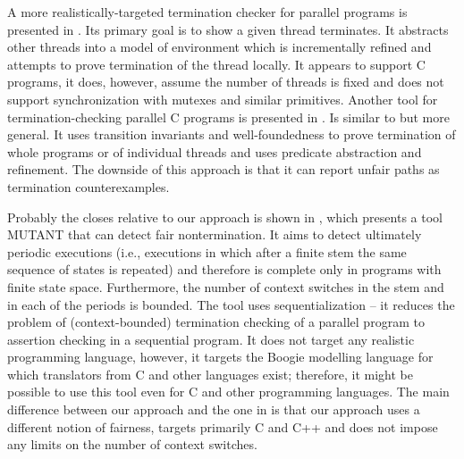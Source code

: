 
A more realistically-targeted termination checker for parallel programs is presented in .
Its primary goal is to show a given thread terminates.
It abstracts other threads into a model of environment which is incrementally refined and attempts to prove termination of the thread locally.
It appears to support C programs, it does, however, assume the number of threads is fixed and does not support synchronization with mutexes and similar primitives.
Another tool for termination-checking parallel C programs is presented in .
Is similar to \cite{Cook2007thr} but more general.
It uses transition invariants and well-foundedness to prove termination of whole programs or of individual threads and uses predicate abstraction and refinement.
The downside of this approach is that it can report unfair paths as termination counterexamples.

Probably the closes relative to our approach is shown in , which presents a tool MUTANT that can detect fair nontermination.
It aims to detect ultimately periodic executions (i.e., executions in which after a finite stem the same sequence of states is repeated) and therefore is complete only in programs with finite state space.
Furthermore, the number of context switches in the stem and in each of the periods is bounded.
The tool uses sequentialization -- it reduces the problem of (context-bounded) termination checking of a parallel program to assertion checking in a sequential program.
It does not target any realistic programming language, however, it targets the Boogie modelling language for which translators from C and other languages exist; therefore, it might be possible to use this tool even for C and other programming languages.
The main difference between our approach and the one in \cite{Atig2012term} is that our approach uses a different notion of fairness, targets primarily C and C++ and does not impose any limits on the number of context switches.

